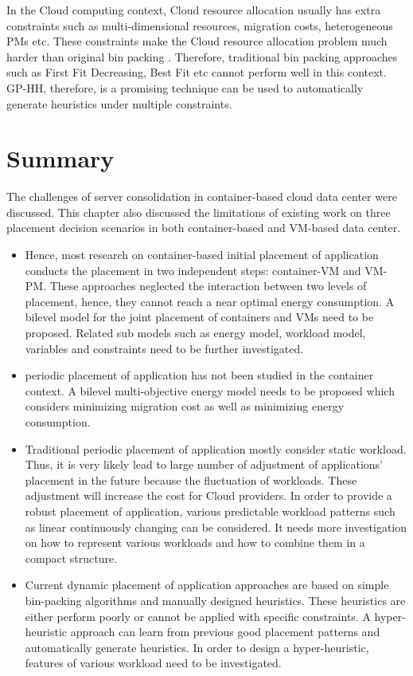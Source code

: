 In the Cloud computing context,  Cloud resource allocation usually has extra constraints such as multi-dimensional resources, migration costs, heterogeneous PMs etc. These constraints make the Cloud resource allocation problem much harder than original bin packing \cite{Mann:2015ua}. Therefore, traditional bin packing approaches such as First Fit Decreasing, Best Fit etc cannot perform well in this context.  GP-HH, therefore, is a promising technique can be used to automatically generate heuristics under multiple constraints.


\section{Summary}

 The challenges of server consolidation in container-based cloud data center were discussed. This chapter also discussed the limitations of existing work on three placement decision scenarios in both container-based and VM-based data center. 

\begin{itemize}
	\item {} Hence, most research on container-based initial placement of application conducts the placement in two independent steps: container-VM and VM-PM. These approaches neglected the interaction between two levels of placement, hence, they cannot reach a near optimal energy consumption. A bilevel model for the joint placement of containers and VMs need to be proposed. Related sub models such as energy model, workload model, variables and constraints need to be further investigated.
	\item periodic placement of application has not been studied in the container context. A bilevel multi-objective energy model needs to be proposed which considers minimizing migration cost as well as minimizing energy consumption. 
	\item Traditional periodic placement of application mostly consider static workload. Thus, it is very likely lead to large number of adjustment of applications' placement in the future because the fluctuation of workloads. These adjustment will increase the cost for Cloud providers. In order to provide a robust placement of application, various predictable workload patterns such as linear continuously changing can be considered. It needs more investigation on how to represent various workloads and how to combine them in a compact structure.
	\item Current dynamic placement of application approaches are based on simple bin-packing algorithms and manually designed heuristics. These heuristics are either perform poorly or cannot be applied with specific constraints. A hyper-heuristic approach can learn from previous good placement patterns and automatically generate heuristics. In order to design a hyper-heuristic, features of various workload need to be investigated. 
\end{itemize}


